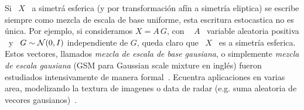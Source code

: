 Si \  $X$ \  a simetr\'a  esferica (y por  transformaci\'on af\'in  a simetr\'ia
eliptica)  se escribe  siempre  como mezcla  de  escala de  base uniforme,  esta
escritura estocastica no es \'unica. Por  ejemplo, si consideramos $X = A \, G$,
con \
$A$ \ variable  aleatoria positiva \ y \ $G \sim  \mathcal{N}(0,I)$ independiente de $G$,
queda claro que \ $X$ \  es a simetr\'ia esferica. Estos vectores, llamados {\em
  mezcla  de escala  de  base gausiana},  o  simplemente {\em  mezcla de  escala
  gausiana}  (GSM para  Gaussian scale  mixture en  ingl\'es)  fueron estudiados
intensivamente de manera formal~\cite{Kan94,  Yao73, Ver64, Pic70, Kel71, Kin72,
  KeiSte74, Tei60, AndMal74}.  Ecuentra aplicaciones en varias area, modelizando
la  textura  de imagenes  o  data  de radar  (e.g.   suma  aleatoria de  vecores
gausianos)~\cite{PorStr03,   BomBea08,  Sel08,  ShiSel07,   ZozVig10,  TisNic04,
  TodTab07}.

